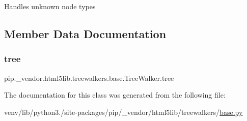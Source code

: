 \begin{DoxyVerb}Handles unknown node types\end{DoxyVerb}
 

\subsection{Member Data Documentation}
\mbox{\label{classpip_1_1__vendor_1_1html5lib_1_1treewalkers_1_1base_1_1TreeWalker_a687cbb77f22cf4bd25d91dc52e8da681}} 
\subsubsection{\texorpdfstring{tree}{tree}}
{\footnotesize\ttfamily pip.\+\_\+vendor.\+html5lib.\+treewalkers.\+base.\+Tree\+Walker.\+tree}



The documentation for this class was generated from the following file\+:\begin{DoxyCompactItemize}
\item 
venv/lib/python3./site-\/packages/pip/\+\_\+vendor/html5lib/treewalkers/\hyperlink{__vendor_2html5lib_2treewalkers_2base_8py}{base.\+py}\end{DoxyCompactItemize}
